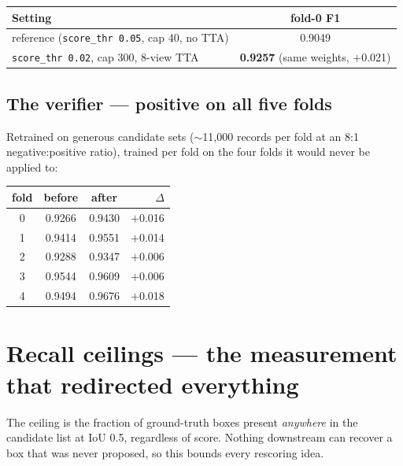 \documentclass[11pt,a4paper]{article}
\begin{document}
\begin{table}[h!]
\centering
\small
\renewcommand{\arraystretch}{1.2}
\begin{tabular}{@{}p{8.2cm}c@{}}
\toprule
\textbf{Setting} & \textbf{fold-0 F1} \\
\midrule
reference (\texttt{score\_thr 0.05}, cap 40, no TTA) & 0.9049 \\
\texttt{score\_thr 0.02}, cap 300, 8-view TTA & \textbf{0.9257} (same weights, $+$0.021) \\
\bottomrule
\end{tabular}
\end{table}

\subsection{The verifier --- positive on all five folds}

Retrained on generous candidate sets ($\sim$11{,}000 records per fold at an 8:1
negative:positive ratio), trained per fold on the four folds it would never be applied to:

\begin{table}[h!]
\centering
\small
\renewcommand{\arraystretch}{1.2}
\begin{tabular}{@{}cccr@{}}
\toprule
\textbf{fold} & \textbf{before} & \textbf{after} & $\Delta$ \\
\midrule
0 & 0.9266 & 0.9430 & $+$0.016 \\
1 & 0.9414 & 0.9551 & $+$0.014 \\
2 & 0.9288 & 0.9347 & $+$0.006 \\
3 & 0.9544 & 0.9609 & $+$0.006 \\
4 & 0.9494 & 0.9676 & $+$0.018 \\
\bottomrule
\end{tabular}
\end{table}

\section{Recall ceilings --- the measurement that redirected everything}

The ceiling is the fraction of ground-truth boxes present \emph{anywhere} in the candidate list at
IoU 0.5, regardless of score. Nothing downstream can recover a box that was never proposed, so
this bounds every rescoring idea.
\end{document}
